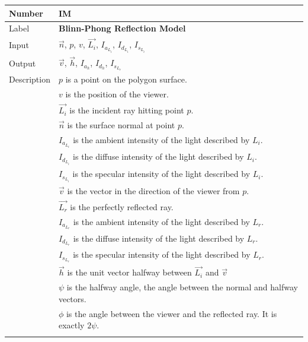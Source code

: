\documentclass[12pt]{article}
\newcommand{\colAwidth}{0.13\textwidth}
\newcommand{\colBwidth}{0.82\textwidth}
\newcounter{instnum} %
\begin{document}
\noindent
\begin{minipage}{\textwidth}
	\renewcommand*{\arraystretch}{1.5}
	\begin{tabular}{| p{\colAwidth} | p{\colBwidth}|}
		\hline
		\rowcolor[gray]{0.9}
		Number& IM{instnum}\theinstnum \label{IM_Blinn_Phong}\\
		\hline
		Label& \bf Blinn-Phong Reflection Model\\
		\hline
		Input& $\vec{n}$, $p$, $v$, $\vec{L_{i}}$, $I_{a_{L_{i}}}$, 
		$I_{d_{L_{i}}}$, $I_{s_{L_{i}}}$\\
		\hline
		Output& $\vec{v}$, $\vec{h}$, $I_{a_{h}}$, $I_{d_{h}}$, 
		$I_{s_{L_{r}}}$ \\		
		\hline
		Description& $p$ is a point on the polygon surface.\\
		& $v$ is the position of the viewer.\\
		& $\vec{L_{i}}$ is the incident ray hitting point $p$.\\
		& $\vec{n}$ is the surface normal at point $p$.\\
		& $I_{a_{L_{i}}}$ is the ambient intensity of the light described by 
		$L_{i}$.\\
		& $I_{d_{L_{i}}}$ is the diffuse intensity of the light described by 
		$L_{i}$. \\
		& $I_{s_{L_{i}}}$ is the specular intensity of the light described by 
		$L_{i}$. \\
		& $\vec{v}$ is the vector in the direction of the viewer from $p$.\\
		& $\vec{L_{r}}$ is the perfectly reflected ray.\\
		& $I_{a_{L_{r}}}$ is the ambient intensity of the light described by 
		$L_{r}$.\\
		& $I_{d_{L_{r}}}$ is the diffuse intensity of the light described by 
		$L_{r}$. \\
		& $I_{s_{L_{r}}}$ is the specular intensity of the light described by 
		$L_{r}$. \\
		& $\vec{h}$ is the unit vector halfway between $\vec{L_{i}}$ and 
		$\vec{v}$ \\
		& $\psi$ is the halfway angle, the angle between the normal and halfway 
		vectors. \\
		& $\phi$ is the angle between the viewer and the reflected ray. It is 
		exactly $2\psi$. \\
		& 

\end{tabular}
\end{minipage}
\end{document}

